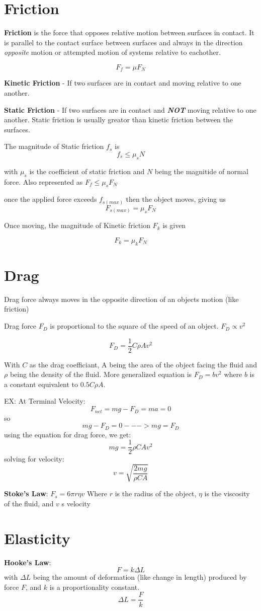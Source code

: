 \documentclass{article}
\begin{document}
\section{Friction}

\textbf{Friction} is the force that opposes relative motion between surfaces in contact. 
It is parallel to the contact surface between surfaces and always in the direction \emph{opposite} motion or attempted motion of systems relative to eachother.

\[F_f = \mu F_N \]

\textbf{Kinetic Friction} - If two surfaces are in contact and moving relative to one another.

\textbf{Static Friction} - If two surfaces are in contact and \emph{\textbf{NOT}} moving relative to one another. Static friction is usually greator than kinetic friction between the surfaces.

The magnitude of Static friction $f_s$ is \[ f_s \leq \mu _s N \]

with $ \mu _s $ is the coefficient of static friction and $N$ being the magnitide of normal force. Also represented as $ F_f \leq  \mu _s F_N$

once the applied force exceeds $f_{s(max)}$ then the object moves, giving us \[F_{s(max)} = \mu _s F_N \]

Once moving, the magnitude of Kinetic friction $F_k$ is given

\[F_k = \mu _k F_N\]


\section{Drag}

Drag force always moves in the opposite direction of an objects motion (like friction)

Drag force $F_D$ is proportional to the square of the speed of an object.
$F_D \propto v^2$

\[ F_D = \frac{1}{2}C \rho Av^2 \]

With $C$ as the drag coefficiant, A being the area of the object facing the fluid and $\rho$ being the density of the fluid. More generalized equation is $F_D = bv^2$ where $b$ is a constant equivalent to $0.5C \rho A$.

EX: At Terminal Velocity:
\[ F_{net} = mg - F_D = ma = 0\]
so \[mg - F_D = 0 ---> mg = F_D \]
using the equation for drag force, we get: \[ mg = \frac{1}{2} \rho C A v^2 \]
solving for velocity:
\[v = \sqrt{ \frac{2mg}{\rho C A}}\]


\textbf{Stoke's Law}: $F_s = 6 \pi r \eta v $
Where $r$ is the radius of the object, $\eta$ is the viscosity of the fluid, and $v$ s velocity


\section{Elasticity}
\textbf{Hooke's Law}: \[F = k \Delta L \]
with $\Delta L$ being the amount of deformation (like change in length) produced by force $F$, and $k$ is a proportionality constant.
\[ \Delta L = \frac {F}{k} \]
\end{document}
